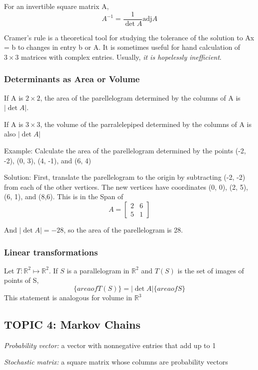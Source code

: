 \documentclass[12pt]{article} %
\newcommand{\R}{\mathbb{R}}
\begin{document}
For an invertible square matrix A, 
$$A^{-1} = \frac{1}{\det A} \text{adj} A$$

Cramer's rule is a theoretical tool for studying the tolerance of the solution to Ax = b to changes in entry b or A. It is sometimes useful for hand calculation of $3 \times 3$ matrices with complex entries. Usually, \emph{it is hopelessly inefficient}.

\subsubsection{Determinants as Area or Volume}
If A is $2 \times 2$, the area of the parellelogram determined by the columns of A is $|\det A|$.

If A is $3 \times 3$, the volume of the parralelepiped determined by the columns of A is also $|\det A|$

Example: Calculate the area of the parellelogram determined by the points (-2, -2), (0, 3), (4, -1), and (6, 4)

Solution:
First, translate the parellelogram to the origin by subtracting (-2, -2) from each of the other vertices.
The new vertices have coordinates (0, 0), (2, 5), (6, 1), and (8,6).
This is in the Span of 
$$A = \begin{bmatrix}
	2 & 6\\
	5 & 1
\end{bmatrix}$$

And $|\det A| = -28$, so the area of the parellelogram is 28.

\subsubsection{Linear transformations}
Let $T : \R^2 \mapsto \R^2$. If $S$ is a parallelogram in $\R^2$ and $T(S)$ is the set of images of points of S, 
$$\{area of T(S)\} = |\det A| \{area of S\}$$
This statement is analogous for volume in $\R^3$

\subsection{TOPIC 4: Markov Chains}
\emph{Probability vector:} a vector with nonnegative entries that add up to 1

\emph{Stochastic matrix:} a square matrix whose columns are probability vectors
\end{document}
